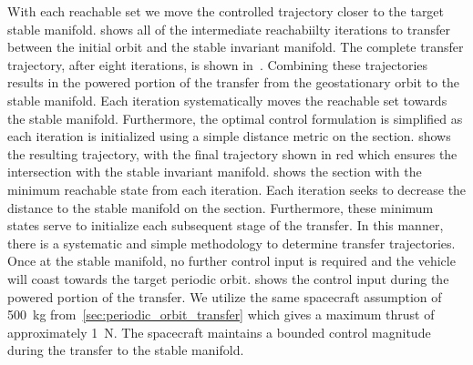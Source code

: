 \documentclass[smallcondensed]{svjour3}
\begin{document}
With each reachable set we move the controlled trajectory closer to the target stable manifold.
 shows all of the intermediate reachabiilty iterations to transfer between the initial orbit and the stable invariant manifold.
The complete transfer trajectory, after eight iterations, is shown in~. 
Combining these trajectories results in the powered portion of the transfer from the geostationary orbit to the stable manifold. 
Each iteration systematically moves the reachable set towards the stable manifold. 
Furthermore, the optimal control formulation is simplified as each iteration is initialized using a simple distance metric on the \Poincare section.
 shows the resulting trajectory, with the final trajectory shown in red which ensures the intersection with the stable invariant manifold.
 shows the \Poincare section with the minimum reachable state from each iteration.
Each iteration seeks to decrease the distance to the stable manifold on the \Poincare section.
Furthermore, these minimum states serve to initialize each subsequent stage of the transfer. 
In this manner, there is a systematic and simple methodology to determine transfer trajectories.
Once at the stable manifold, no further control input is required and the vehicle will coast towards the target periodic orbit.
 shows the control input during the powered portion of the transfer. 
We utilize the same spacecraft assumption of \SI{500}{\kilo\gram} from~\cref{sec:periodic_orbit_transfer} which gives a maximum thrust of approximately \SI{1}{\newton}.
The spacecraft maintains a bounded control magnitude during the transfer to the stable manifold.
\end{document}
